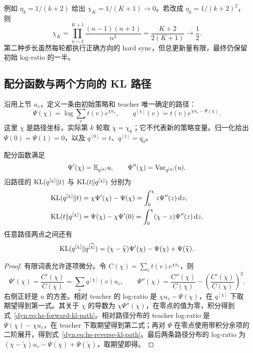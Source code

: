 例如 $\eta_k=1/(k+2)$ 给出 $\chi_K=1/(K+1)\to0$。若改成 $\eta_k=1/(k+2)^2$，则
\begin{equation*}
 \chi_K=\prod_{n=2}^{K+1}\frac{(n-1)(n+1)}{n^2}
 =\frac{K+2}{2(K+1)}\longrightarrow\frac12.
\end{equation*}
第二种步长虽然每轮都执行正确方向的 hard sync，但总更新量有限，最终仍保留初始 log-ratio 的一半。

\subsection{配分函数与两个方向的 KL 路径}

沿用上节 $u_v$，定义一条由初始策略和 teacher 唯一确定的路径：
\begin{equation*}
 \Psi(\chi)=\log\sum_vt(v)e^{\chi u_v},\qquad
 q^{[\chi]}(v)=t(v)e^{\chi u_v-\Psi(\chi)}.
\end{equation*}
这里 $\chi$ 是路径坐标，实际第 $k$ 轮取 $\chi=\chi_k$；它不代表新的策略变量。归一化给出 $\Psi(0)=\Psi(1)=0$，以及 $q^{[0]}=t$、$q^{[1]}=q_0$。

\begin{theorem}[KL 路径的精确积分]
\label{dyn:thm:hs-kl-path}
配分函数满足
\begin{equation*}
 \Psi'(\chi)=\mathbb E_{q^{[\chi]}}u,
 \qquad\Psi''(\chi)=\operatorname{Var}_{q^{[\chi]}}(u).
\end{equation*}
沿路径的 $\operatorname{KL}(q^{[\chi]}\Vert t)$ 与 $\operatorname{KL}(t\Vert q^{[\chi]})$ 分别为
\begin{align}
 \operatorname{KL}(q^{[\chi]}\Vert t)
 &=\chi\Psi'(\chi)-\Psi(\chi)
 =\int_0^\chi z\Psi''(z)\,\mathrm dz,
 \label{dyn:eq:hs-forward-kl-path}\\
 \operatorname{KL}(t\Vert q^{[\chi]})
 &=\Psi(\chi)-\chi\Psi'(0)
 =\int_0^\chi(\chi-z)\Psi''(z)\,\mathrm dz.
 \label{dyn:eq:hs-reverse-kl-path}
\end{align}
任意路径两点之间还有
\begin{equation*}
 \operatorname{KL}(q^{[\chi]}\Vert q^{[\widetilde\chi]})
 =(\chi-\widetilde\chi)\Psi'(\chi)-\Psi(\chi)+\Psi(\widetilde\chi).
\end{equation*}
\end{theorem}

\begin{proof}
有限词表允许逐项微分。令 $C(\chi)=\sum_vt(v)e^{\chi u_v}$，则
\begin{equation*}
 \Psi'(\chi)=\frac{C'(\chi)}{C(\chi)}=\sum_vq^{[\chi]}(v)u_v,
 \qquad
 \Psi''(\chi)=\frac{C''(\chi)}{C(\chi)}-
          \left(\frac{C'(\chi)}{C(\chi)}\right)^2.
\end{equation*}
右侧正好是 $u$ 的方差。相对 teacher 的 log-ratio 是 $\chi u_v-\Psi(\chi)$，在 $q^{[\chi]}$ 下取期望得到第一式。其关于 $\chi$ 的导数为 $\chi\Psi''(\chi)$，在零点的值为零，积分得到式~\eqref{dyn:eq:hs-forward-kl-path}。相对路径分布的 teacher log-ratio 是 $\Psi(\chi)-\chi u_v$，在 teacher 下取期望得到第二式；再对 $\Psi$ 在零点使用带积分余项的二阶展开，得到式~\eqref{dyn:eq:hs-reverse-kl-path}。最后两条路径分布的 log-ratio 为 $(\chi-\widetilde\chi)u_v-\Psi(\chi)+\Psi(\widetilde\chi)$，取期望即得。
\end{proof}

